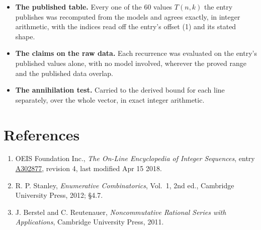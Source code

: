 \documentclass[11pt]{article}
\theoremstyle{definition}
\begin{document}
\begin{itemize}

\item {\bfseries The published table.} Every one of the 60 values $T(n,k)$ the entry publishes was recomputed from the models and agrees exactly, in integer arithmetic, with the indices read off the entry's offset (1) and its stated shape.

\item {\bfseries The claims on the raw data.} Each recurrence was evaluated on the entry's published values alone, with no model involved, wherever the proved range and the published data overlap.

\item {\bfseries The annihilation test.} Carried to the derived bound for each line separately, over the whole vector, in exact integer arithmetic.

\end{itemize}

\section{References}

\begin{enumerate}

\item OEIS Foundation Inc., \emph{The On-Line Encyclopedia of Integer Sequences}, entry \href{https://oeis.org/A302877}{A302877}, revision 4, last modified Apr 15 2018.

\item R. P. Stanley, \emph{Enumerative Combinatorics}, Vol.~1, 2nd ed., Cambridge University Press, 2012; \S4.7.

\item J. Berstel and C. Reutenauer, \emph{Noncommutative Rational Series with Applications}, Cambridge University Press, 2011.

\end{enumerate}
\end{document}
